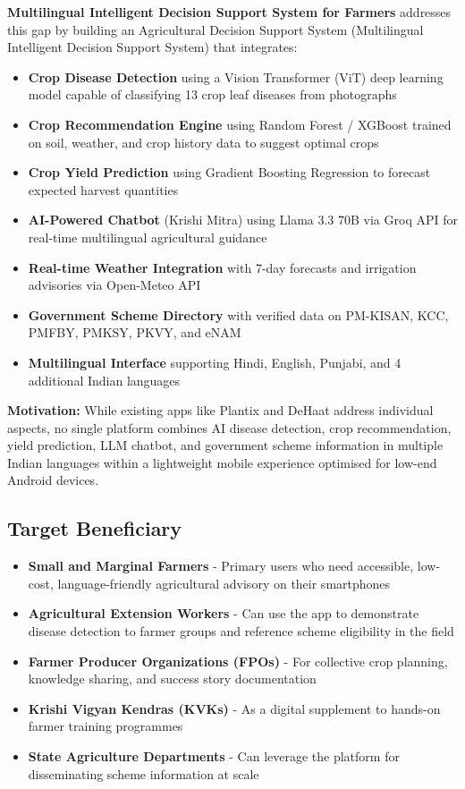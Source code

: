\documentclass[12pt,a4paper]{article}
\begin{document}
\textbf{Multilingual Intelligent Decision Support System for Farmers} addresses this gap by building an Agricultural Decision Support System (Multilingual Intelligent Decision Support System) that integrates:

\begin{itemize}
    \item \textbf{Crop Disease Detection} using a Vision Transformer (ViT) deep learning model capable of classifying 13 crop leaf diseases from photographs
    \item \textbf{Crop Recommendation Engine} using Random Forest / XGBoost trained on soil, weather, and crop history data to suggest optimal crops
    \item \textbf{Crop Yield Prediction} using Gradient Boosting Regression to forecast expected harvest quantities
    \item \textbf{AI-Powered Chatbot} (Krishi Mitra) using Llama 3.3 70B via Groq API for real-time multilingual agricultural guidance
    \item \textbf{Real-time Weather Integration} with 7-day forecasts and irrigation advisories via Open-Meteo API
    \item \textbf{Government Scheme Directory} with verified data on PM-KISAN, KCC, PMFBY, PMKSY, PKVY, and eNAM
    \item \textbf{Multilingual Interface} supporting Hindi, English, Punjabi, and 4 additional Indian languages
\end{itemize}

\textbf{Motivation:} While existing apps like Plantix and DeHaat address individual aspects, no single platform combines AI disease detection, crop recommendation, yield prediction, LLM chatbot, and government scheme information in multiple Indian languages within a lightweight mobile experience optimised for low-end Android devices.

\subsection{Target Beneficiary}

\begin{itemize}
    \item \textbf{Small and Marginal Farmers} - Primary users who need accessible, low-cost, language-friendly agricultural advisory on their smartphones
    \item \textbf{Agricultural Extension Workers} - Can use the app to demonstrate disease detection to farmer groups and reference scheme eligibility in the field
    \item \textbf{Farmer Producer Organizations (FPOs)} - For collective crop planning, knowledge sharing, and success story documentation
    \item \textbf{Krishi Vigyan Kendras (KVKs)} - As a digital supplement to hands-on farmer training programmes
    \item \textbf{State Agriculture Departments} - Can leverage the platform for disseminating scheme information at scale
\end{itemize}
\end{document}
